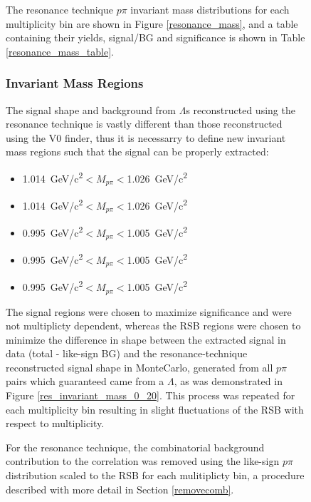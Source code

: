 \documentclass[ALICE,manyauthors]{ALICE_analysis_notes}
\begin{document}
\begin{figure}[ht]
The resonance technique $p\pi$ invariant mass distributions for each multiplicity bin are shown in Figure \ref{resonance_mass}, and a table containing their yields, signal/BG and significance is shown in Table \ref{resonance_mass_table}.


\subsubsection{Invariant Mass Regions}

The signal shape and background from $\Lambda$s reconstructed using the resonance technique is vastly different than those reconstructed using the V0 finder, thus it is necessarry to define new invariant mass regions such that the signal can be properly extracted:

\begin{itemize}
	\item {}  \SI{1.014}{GeV/c^2}$< M_{p\pi} < $\SI{1.026}{GeV/c^2}
	\item {}  \SI{1.014}{GeV/c^2}$< M_{p\pi} < $\SI{1.026}{GeV/c^2}
	\item  {}  \SI{0.995}{GeV/c^2}$< M_{p\pi} < $\SI{1.005}{GeV/c^2}
	\item  {}  \SI{0.995}{GeV/c^2}$< M_{p\pi} < $\SI{1.005}{GeV/c^2}
	\item  {}  \SI{0.995}{GeV/c^2}$< M_{p\pi} < $\SI{1.005}{GeV/c^2}
\end{itemize}

The signal regions were chosen to maximize significance and were not multiplicty dependent, whereas the RSB regions were chosen to minimize the difference in shape between the extracted signal in data (total - like-sign BG) and the resonance-technique reconstructed signal shape in MonteCarlo, generated from all $p\pi$ pairs which guaranteed came from a $\Lambda$, as was demonstrated in Figure \ref{res_invariant_mass_0_20}. This process was repeated for each multiplicity bin resulting in slight fluctuations of the RSB with respect to multiplicity.

For the resonance technique, the combinatorial background contribution to the correlation was removed using the like-sign $p\pi$ distribution scaled to the RSB for each mulitiplicty bin, a procedure described with more detail in Section \ref{removecomb}.


\end{figure}
\end{document}
